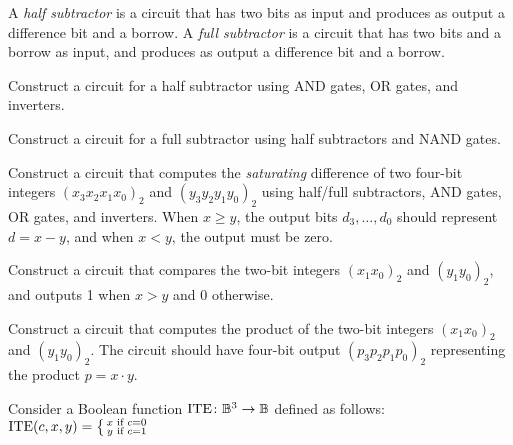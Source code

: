 \documentclass[a4paper,12pt]{article}
\newenvironment{smallcases}{%
    \bigl\lbrace\begin{smallmatrix}%
}{%
    \end{smallmatrix}%
}
\begin{document}
\begin{tasks}
    \item A \textit{half subtractor} is a circuit that has two bits as input and produces as output a difference bit and a borrow. A \textit{full subtractor} is a circuit that has two bits and a borrow as input, and produces as output a difference bit and a borrow.

    \begin{subtasks}
        \item Construct a circuit for a half subtractor using AND gates, OR gates, and inverters.

        \item Construct a circuit for a full subtractor using half subtractors and NAND gates.

        \item Construct a circuit that computes the \textit{saturating} difference of two four-bit integers $(x_3 x_2 x_1 x_0)_2$ and $(y_3 y_2 y_1 y_0)_2$ using half/full subtractors, AND gates, OR gates, and inverters.
        When $x \geq y$, the output bits $d_3, \dots, d_0$ should represent $d = x - y$, and when $x < y$, the output must be zero.
    \end{subtasks}


    \item Construct a circuit that compares the two-bit integers $(x_1 x_0)_2$ and $(y_1 y_0)_2$, and outputs 1 when $x > y$ and 0 otherwise.


    \item Construct a circuit that computes the product of the two-bit integers $(x_1 x_0)_2$ and $(y_1 y_0)_2$.
    The circuit should have four-bit output $(p_3 p_2 p_1 p_0)_2$ representing the product $ p = x \cdot y$.




    \item Consider a Boolean function $\operatorname{ITE} \colon \mathbb{B}^3 \to \mathbb{B}$ defined as follows:
    $\operatorname{ITE}(c,x,y) = \begin{smallcases}
        x & \text{if } c = 0 \\
        y & \text{if } c = 1
    \end{smallcases}$


\end{tasks}
\end{document}
